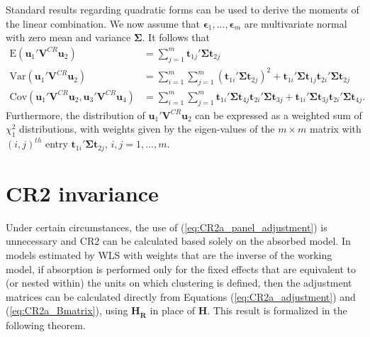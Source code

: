 \documentclass[12pt]{article}\usepackage[]{graphicx}\usepackage[]{color}
\newcommand{\E}{\text{E}}
\newcommand{\Cov}{\text{Cov}}
\newcommand{\Var}{\text{Var}}
\newcommand{\bm}{\mathbf}
\newcommand{\bs}{\boldsymbol}
\begin{document}
Standard results regarding quadratic forms can be used to derive the moments of the linear combination. We now assume that $\bs\epsilon_1,...,\bs\epsilon_m$ are multivariate normal with zero mean and variance $\bs\Sigma$. It follows that 
\begin{align}
\label{eq:CRVE_expectation}
\E\left(\bm{u}_1' \bm{V}^{CR} \bm{u}_2\right) &= \sum_{j=1}^m \bm{t}_{1j}' \bs\Sigma \bm{t}_{2j} \\
\label{eq:CRVE_variance}
\Var\left(\bm{u}_1' \bm{V}^{CR} \bm{u}_2\right) &= \sum_{i=1}^m \sum_{j=1}^m \left(\bm{t}_{1i}' \bs\Sigma \bm{t}_{2j}\right)^2 + \bm{t}_{1i}' \bs\Sigma \bm{t}_{1j} \bm{t}_{2i}' \bs\Sigma \bm{t}_{2j} \\
\label{eq:CRVE_covariance}
\Cov\left(\bm{u}_1' \bm{V}^{CR} \bm{u}_2, \bm{u}_3' \bm{V}^{CR} \bm{u}_4\right) &= \sum_{i=1}^m \sum_{j=1}^m \bm{t}_{1i}' \bs\Sigma \bm{t}_{4j} \bm{t}_{2i}' \bs\Sigma \bm{t}_{3j} + \bm{t}_{1i}' \bs\Sigma \bm{t}_{3j} \bm{t}_{2i}' \bs\Sigma \bm{t}_{4j}.
\end{align}
Furthermore, the distribution of $\bm{u}_1' \bm{V}^{CR} \bm{u}_2$ can be expressed as a weighted sum of $\chi^2_1$ distributions, with weights given by the eigen-values of the $m \times m$ matrix with $\left(i,j\right)^{th}$ entry $\bm{t}_{1i}' \bs\Sigma \bm{t}_{2j}$, $i,j=1,...,m$.

\section{CR2 invariance}
\label{app:theorem1}

Under certain circumstances, the use of (\ref{eq:CR2a_panel_adjustment}) is unnecessary and CR2 can be calculated based solely on the absorbed model. In models estimated by WLS with weights that are the inverse of the working model, if absorption is performed only for the fixed effects that are equivalent to (or nested within) the units on which clustering is defined, then the adjustment matrices can be calculated directly from Equations (\ref{eq:CR2a_adjustment}) and (\ref{eq:CR2a_Bmatrix}), using $\bm{H_{\ddot{R}}}$ in place of $\bm{H}$. This result is formalized in the following theorem.
\end{document}
